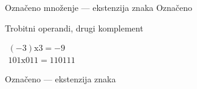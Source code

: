 
\begin{frame}[label=05-s039]{Označeno množenje — ekstenzija znaka}
\fontsize{10}{12}\selectfont
Označeno\par Trobitni operandi, drugi komplement\par $\begin{gathered}(-3)\mathrm{x}3=-9\\101\mathrm{x}011=110111\end{gathered}$
\begin{center}\par\vspace{3mm}\alert{Označeno — ekstenzija znaka}\end{center}
\end{frame}
